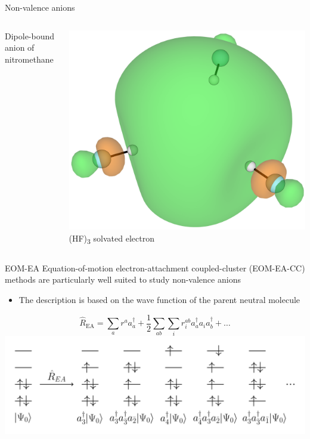 \documentclass[9pt,t,xcolor=table]{beamer}
\begin{document}
\begin{frame}{\huge Non-valence anions}
\begin{columns}
\begin{column}{0.3\textwidth}
			\vspace{3pt}
    		\small Dipole-bound anion of nitromethane
		\end{column}
		\begin{column}{0.27\textwidth}
			\centering
			\includegraphics[width=\textwidth]{Figs/hf3.png}\\
			\vspace{3pt}
			\small (HF)\textsubscript{3} solvated electron
		\end{column}	
	\end{columns}
\end{frame}

\begin{frame}{\huge EOM-EA}\large
	Equation-of-motion electron-attachment coupled-cluster (EOM-EA-CC) methods are particularly well suited to study non-valence anions
	\vspace{5pt}
	\begin{itemize}
		\item The description is based on the wave function of the parent neutral molecule
	\end{itemize}
	\centering
	\vspace{5pt} 
			\[ \hat{R}_{\mathrm{EA}} = \sum_{a} r^a a_a^\dagger + \frac{1}{2} \sum_{ab} \sum_{i} r_{i}^{ab} a_a^\dagger a_i a_b^\dagger + \dots \]
	\includegraphics[width=\textwidth]{Figs/EOM_EA.pdf}
\end{frame}
\end{document}
